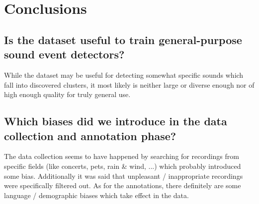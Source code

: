 
\section{Conclusions}
\label{sec:Conclusions}


\subsection{Is the dataset useful to train general-purpose sound event detectors?}
\label{sec:Conclusions:a}

While the dataset may be useful for detecting somewhat specific sounds which fall into discovered clusters, it most likely is neither large or diverse enough nor of high enough quality for truly general use.

\subsection{Which biases did we introduce in the data collection and annotation phase?}
\label{sec:Conclusions:c}

The data collection seems to have happened by searching for recordings from specific fields (like concerts, pets, rain \& wind, ...) which probably introduced some bias. Additionally it was said that unpleasant / inappropriate recordings were specifically filtered out. As for the annotations, there definitely are some language / demographic biases which take effect in the data.

